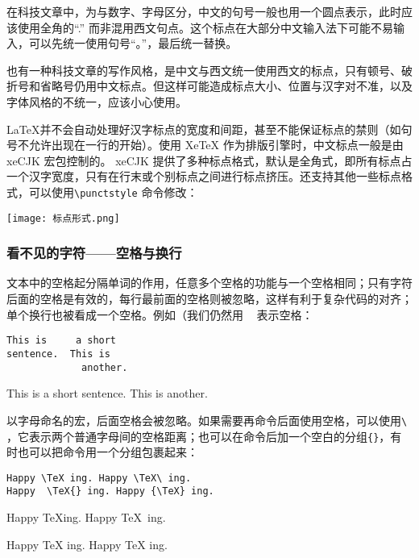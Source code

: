 在科技文章中，为与数字、字母区分，中文的句号一般也用一个圆点表示，此时应该使用全角的“.” 而非混用西文句点。这个标点在大部分中文输入法下可能不易输入，可以先统一使用句号“。”，最后统一替换。

也有一种科技文章的写作风格，是中文与西文统一使用西文的标点，只有顿号、破折号和省略号仍用中文标点。但这样可能造成标点大小、位置与汉字对不准，以及字体风格的不统一，应该小心使用。

\LaTeX 并不会自动处理好汉字标点的宽度和间距，甚至不能保证标点的禁则（如句号不允许出现在一行的开始）。使用 XeTeX 作为排版引擎时，中文标点一般是由 xeCJK 宏包控制的。 xeCJK 提供了多种标点格式，默认是全角式，即所有标点占一个汉字宽度，只有在行末或个别标点之间进行标点挤压。还支持其他一些标点格式，可以使用\verb|\punctstyle| 命令修改：

\begin{center}
    \texttt{[image: 标点形式.png]} \centering
\end{center}

\subsubsection{看不见的字符——空格与换行}

文本中的空格起分隔单词的作用，任意多个空格的功能与一个空格相同；只有字符后面的空格是有效的，每行最前面的空格则被忽略，这样有利于复杂代码的对齐；单个换行也被看成一个空格。例如（我们仍然用 \lstinline[showspaces=true]{ } 表示空格：

\begin{minipage}[t]{0.45\textwidth}
    \begin{lstlisting}[showspaces=true]
This is     a short
sentence.  This is
             another.
\end{lstlisting}
\end{minipage}
\hfill
\begin{minipage}[c]{0.45\textwidth}
This is     a short
sentence.  This is
             another.
\end{minipage}

以字母命名的宏，后面空格会被忽略。如果需要再命令后面使用空格，可以使用\lstinline[showspaces=true]{\ }，它表示两个普通字母间的空格距离；也可以在命令后加一个空白的分组\verb|{}|，有时也可以把命令用一个分组包裹起来：

\begin{minipage}[t]{0.45\textwidth}
\begin{lstlisting}[showspaces=true]
Happy \TeX ing. Happy \TeX\ ing.
Happy  \TeX{} ing. Happy {\TeX} ing.
\end{lstlisting}
\end{minipage}
\hfill
\begin{minipage}[t]{0.45\textwidth}
Happy \TeX ing. Happy \TeX\ ing.

Happy  \TeX{} ing. Happy {\TeX} ing.
\end{minipage}

